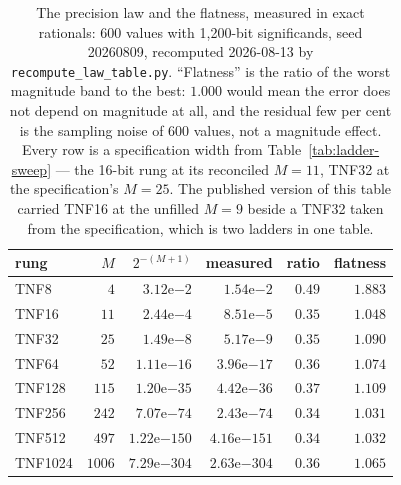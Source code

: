 \begin{table}[t]\centering
\caption{The precision law and the flatness, measured in exact rationals: 600
values with 1{,}200-bit significands, seed 20260809, recomputed
2026-08-13 by \texttt{recompute\_\allowbreak law\_\allowbreak table.py}. ``Flatness'' is the ratio of the
worst magnitude band to the best: $1.000$ would mean the error does not depend on
magnitude at all, and the residual few per cent is the sampling noise of 600
values, not a magnitude effect. Every row is a specification width from
Table~\ref{tab:ladder-sweep} --- the 16-bit rung at its reconciled $M{=}11$,
TNF32 at the specification's $M{=}25$. The published version of this table
carried TNF16 at the unfilled $M{=}9$ beside a TNF32 taken from the
specification, which is two ladders in one table.}
\label{tab:law}
\begin{tabular}{lrrrrr}
\toprule
rung & $M$ & $2^{-(M+1)}$ & measured & ratio & flatness \\
\midrule
TNF8    & $4$    & $3.12\mathrm{e}{-2}$   & $1.54\mathrm{e}{-2}$   & $0.49$ & $1.883$ \\
TNF16   & $11$   & $2.44\mathrm{e}{-4}$   & $8.51\mathrm{e}{-5}$   & $0.35$ & $1.048$ \\
TNF32   & $25$   & $1.49\mathrm{e}{-8}$   & $5.17\mathrm{e}{-9}$   & $0.35$ & $1.090$ \\
TNF64   & $52$   & $1.11\mathrm{e}{-16}$  & $3.96\mathrm{e}{-17}$  & $0.36$ & $1.074$ \\
TNF128  & $115$  & $1.20\mathrm{e}{-35}$  & $4.42\mathrm{e}{-36}$  & $0.37$ & $1.109$ \\
TNF256  & $242$  & $7.07\mathrm{e}{-74}$  & $2.43\mathrm{e}{-74}$  & $0.34$ & $1.031$ \\
TNF512  & $497$  & $1.22\mathrm{e}{-150}$ & $4.16\mathrm{e}{-151}$ & $0.34$ & $1.032$ \\
TNF1024 & $1006$ & $7.29\mathrm{e}{-304}$ & $2.63\mathrm{e}{-304}$ & $0.36$ & $1.065$ \\
\bottomrule
\end{tabular}
\end{table}

